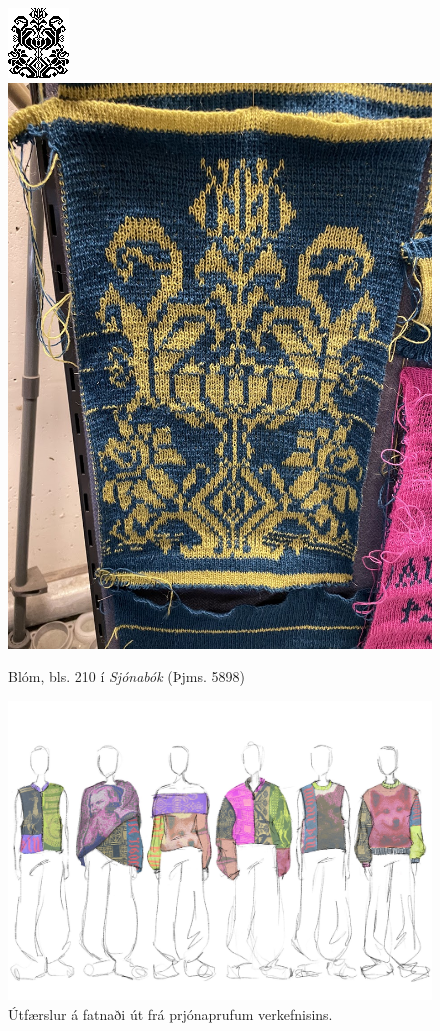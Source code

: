 \documentclass[a4paper,10pt,twocolumn]{article}
\begin{document}
\begin{figure}
    \centering
    \includegraphics[width=0.45\linewidth]{figs/thjms5898_210.png}
    \hfill
    \includegraphics[width=0.45\linewidth]{figs/flower.jpg}
    \caption{Blóm, bls. 210 í \textit{Sjónabók} (Þjms. 5898)}
    \label{fig:flower}
\end{figure}

\begin{figure}
    \centering
    \includegraphics[width=\linewidth]{figs/collection.JPG}
    \caption{Útfærslur á fatnaði út frá prjónaprufum verkefnisins.}
    \label{fig:designproposal}
\end{figure}
\end{document}
